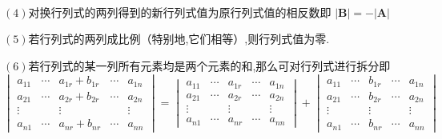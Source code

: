 \begin{green}
\begin{corollary}[列情形]\label{cor:列情形}
    \,

    $(4)$对换行列式的两列得到的新行列式值为原行列式值的相反数即
    $\left|\bm{B}\right|=-\left|\bm{A}\right|$

    $(5)$若行列式的两列成比例（特别地,它们相等）,则行列式值为零.

    $(6)$若行列式的某一列所有元素均是两个元素的和,那么可对行列式进行拆分即\[
    \begin{vmatrix}
        a_{11}&\cdots&a_{1r}+b_{1r}&\cdots&a_{1n}\\
        a_{21}&\cdots&a_{2r}+b_{2r}&\cdots&a_{2n}\\
        \vdots& &\vdots& &\vdots\\
        a_{n1}&\cdots&a_{nr}+b_{nr}&\cdots&a_{nn}
    \end{vmatrix}=
    \begin{vmatrix}
        a_{11}&\cdots&a_{1r}&\cdots&a_{1n}\\
        a_{21}&\cdots&a_{2r}&\cdots&a_{2n}\\
        \vdots& &\vdots& &\vdots\\
        a_{n1}&\cdots&a_{nr}&\cdots&a_{nn}
    \end{vmatrix}+
    \begin{vmatrix}
        a_{11}&\cdots&b_{1r}&\cdots&a_{1n}\\
        a_{21}&\cdots&b_{2r}&\cdots&a_{2n}\\
        \vdots& &\vdots& &\vdots\\
        a_{n1}&\cdots&b_{nr}&\cdots&a_{nn}
    \end{vmatrix}
    \]


\end{corollary}
\end{green}
